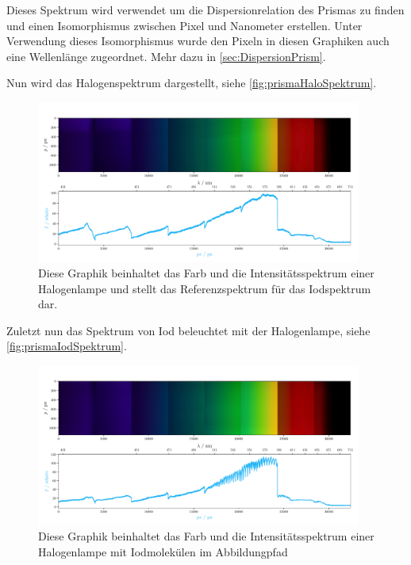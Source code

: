 \documentclass[12pt,english,ngerman]{scrartcl}
\begin{document}
Dieses Spektrum wird verwendet um die Dispersionrelation des Prismas zu finden
und einen Isomorphismus zwischen Pixel und Nanometer erstellen. Unter
Verwendung dieses Isomorphismus wurde den Pixeln in diesen Graphiken auch eine
Wellenlänge zugeordnet. Mehr dazu in \autoref{sec:DispersionPrism}.

Nun wird das Halogenspektrum dargestellt, siehe
\autoref{fig:prismaHaloSpektrum}. 
\begin{figure}[H]
	\begin{center}
		\includegraphics[width=0.95\textwidth]{figures/Halo_plot.pdf}
	\end{center}
	\caption{
		Diese Graphik beinhaltet das Farb und die Intensitätsspektrum einer
		Halogenlampe und stellt das Referenzspektrum für das Iodspektrum dar. 
	}\label{fig:prismaHaloSpektrum}
\end{figure}

Zuletzt nun das Spektrum von Iod beleuchtet mit der Halogenlampe, siehe
\autoref{fig:prismaIodSpektrum}.

\begin{figure}[H]
	\begin{center}
		\includegraphics[width=0.95\textwidth]{figures/I_plot.pdf}
	\end{center}
	\caption{Diese Graphik beinhaltet das Farb und die Intensitätsspektrum einer
		Halogenlampe mit Iodmolekülen im Abbildungpfad
	}\label{fig:prismaIodSpektrum}
\end{figure}
\end{document}

